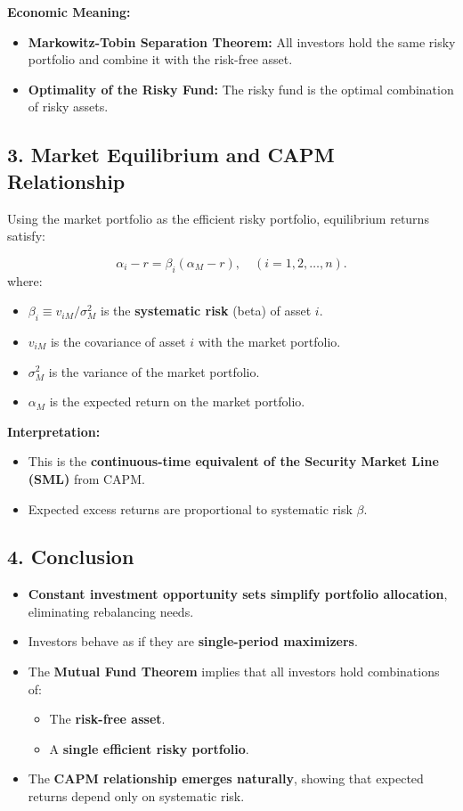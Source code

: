 \documentclass{article}
\begin{document}
\textbf{Economic Meaning:}
\begin{itemize}
    \item \textbf{Markowitz-Tobin Separation Theorem:} 
    All investors hold the same risky portfolio and combine it with the risk-free asset.
    \item \textbf{Optimality of the Risky Fund:} 
    The risky fund is the optimal combination of risky assets.
\end{itemize}

\subsection*{3. Market Equilibrium and CAPM Relationship}
Using the market portfolio as the efficient risky portfolio, equilibrium returns satisfy:

\begin{equation}
\alpha_i - r = \beta_i (\alpha_M - r), \quad (i = 1, 2, \dots, n).
\end{equation}
where:
\begin{itemize}
    \item \( \beta_i \equiv v_{iM} / \sigma_M^2 \) is the \textbf{systematic risk} (beta) of asset \( i \).
    \item \( v_{iM} \) is the covariance of asset \( i \) with the market portfolio.
    \item \( \sigma_M^2 \) is the variance of the market portfolio.
    \item \( \alpha_M \) is the expected return on the market portfolio.
\end{itemize}

\textbf{Interpretation:}
\begin{itemize}
    \item This is the \textbf{continuous-time equivalent of the Security Market Line (SML)} from CAPM.
    \item Expected excess returns are proportional to systematic risk \( \beta \).
\end{itemize}

\subsection*{4. Conclusion}
\begin{itemize}
    \item \textbf{Constant investment opportunity sets simplify portfolio allocation}, eliminating rebalancing needs.
    \item Investors behave as if they are \textbf{single-period maximizers}.
    \item The \textbf{Mutual Fund Theorem} implies that all investors hold combinations of:
    \begin{itemize}
        \item The \textbf{risk-free asset}.
        \item A \textbf{single efficient risky portfolio}.
    \end{itemize}
    \item The \textbf{CAPM relationship emerges naturally}, showing that expected returns depend only on systematic risk.
\end{itemize}
\end{document}
